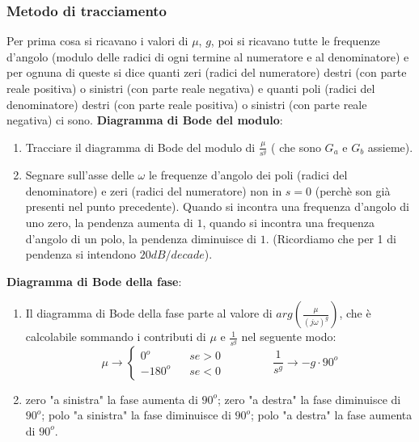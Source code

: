 \subsubsection{Metodo di tracciamento}
Per prima cosa si ricavano i valori di $\mu$, $g$, poi si ricavano tutte le frequenze d'angolo (modulo delle radici di ogni termine al numeratore e al denominatore) e per ognuna di queste si dice quanti zeri (radici del numeratore) destri (con parte reale positiva) o sinistri (con parte reale negativa) e quanti poli (radici del denominatore) destri (con parte reale positiva) o sinistri (con parte reale negativa) ci sono.
\textbf{Diagramma di Bode del modulo}: 
\begin{enumerate}
    \item Tracciare il diagramma di Bode del modulo di $\frac{\mu}{s^g}$ ( che sono $G_a$ e $G_b$ assieme).
    \item Segnare sull'asse delle $\omega$ le frequenze d'angolo dei poli (radici del denominatore) e zeri (radici del numeratore) non in $s=0$ (perchè son già presenti nel punto precedente).\newline
    Quando si incontra una frequenza d'angolo di uno zero, la pendenza aumenta di $1$, quando si incontra una frequenza d'angolo di un polo, la pendenza diminuisce di $1$. (Ricordiamo che per 1 di pendenza si intendono $20 dB/decade$).
\end{enumerate}
\textbf{Diagramma di Bode della fase}:
\begin{enumerate}
    \item Il diagramma di Bode della fase parte al valore di $arg(\frac{\mu}{(j \omega)^g})$, che è calcolabile sommando i contributi di $\mu$ e $\frac{1}{s^g}$ nel seguente modo:
    \[
        \mu \rightarrow \begin{cases}
            0^o \;\;\;& se > 0\\
            -180^o \;\;\; & se <0
        \end{cases} \;\;\;\;\;\;\;\;\;\;\;\;\;\;\; \frac{1}{s^g}\rightarrow -g \cdot 90^o
    \]
    \item zero "a sinistra" la fase aumenta di $90^o$;\newline
    zero "a destra" la fase diminuisce di $90^o$;\newline
    polo "a sinistra" la fase diminuisce di $90^o$;\newline
    polo "a destra" la fase aumenta di $90^o$.
\end{enumerate}
